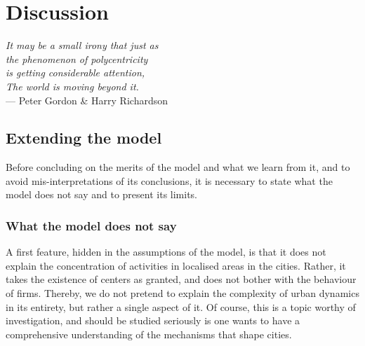 \chapter{Discussion}
\label{chap:monocentric_discussion}

\begin{flushright}{\slshape    
It may be a small irony that  
just as\\
the phenomenon of polycentricity\\ is getting considerable attention,\\
The world is moving beyond it.} \\ \medskip
--- Peter Gordon \& Harry Richardson~\cite{Gordon:1996}
\end{flushright}


\bigskip


\section{Extending the model}
\label{sec:model}

Before concluding on the merits of the model and what we learn from it, and to
avoid mis-interpretations of its conclusions, it is necessary to state what the
model does not say and to present its limits.

\subsection{What the model does not say}
\label{sec:what_the_model_does_not_say}


A first feature, hidden in the assumptions of the model, is that it does
not explain the concentration of activities in localised areas in the cities.
Rather, it takes the existence of centers as granted, and does not bother with
the behaviour of firms. Thereby, we do not pretend to explain the complexity of
urban dynamics in its entirety, but rather a single aspect of it. Of course,
this is a topic worthy of investigation, and should be studied seriously is one
wants to have a comprehensive understanding of the mechanisms that shape cities.

